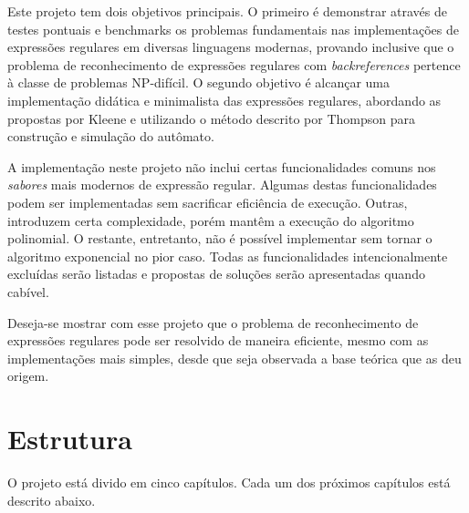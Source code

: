 \documentclass[a4paper,12pt,oneside,onecolumn]{uerj}
\begin{document}
Este projeto tem dois objetivos principais. O primeiro é demonstrar através de testes pontuais e benchmarks os problemas fundamentais nas implementações de expressões regulares em diversas linguagens modernas, provando inclusive que o problema de reconhecimento de expressões regulares com \emph{backreferences} pertence à classe de problemas NP-difícil. O segundo objetivo é alcançar uma implementação didática e minimalista das expressões regulares, abordando as propostas por Kleene e utilizando o método descrito por Thompson para construção e simulação do autômato.

A implementação neste projeto não inclui certas funcionalidades comuns nos \emph{sabores} mais modernos de expressão regular. Algumas destas funcionalidades podem ser implementadas sem sacrificar eficiência de execução. Outras, introduzem certa complexidade, porém mantêm a execução do algoritmo polinomial. O restante, entretanto, não é possível implementar sem tornar o algoritmo exponencial no pior caso. Todas as funcionalidades intencionalmente excluídas serão listadas e propostas de soluções serão apresentadas quando cabível.

Deseja-se mostrar com esse projeto que o problema de reconhecimento de expressões regulares pode ser resolvido de maneira eficiente, mesmo com as implementações mais simples, desde que seja observada a base teórica que as deu origem.

\section{Estrutura}

O projeto está divido em cinco capítulos. Cada um dos próximos capítulos está descrito abaixo.
\end{document}
